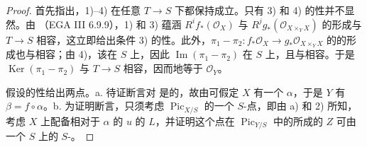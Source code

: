 \begin{proof}
首先指出，1)--4) 在任意 $T\to S$ 下都保持成立。只有 3) 和 4) 的性并不显然。由 （EGA III 6.9.9），1) 和 3) 蕴涵 $R^if_*(\mathcal O_X)$ 与 $R^jg_*(\mathcal O_{X\times_YX})$ 的形成与 $T\to S$ 相容，这立即给出条件 3) 的性。此外，$\pi_1-\pi_2:f_*\mathcal O_X\to g_*\mathcal O_{X\times_YX}$ 的的形成也与相容；由 4)，该在 $S$ 上，因此 $\operatorname{Im}(\pi_1-\pi_2)$ 在 $S$ 上，且与相容。于是 $\operatorname{Ker}(\pi_1-\pi_2)$ 与 $T\to S$ 相容，因而地等于 $\mathcal O_Y$。

假设的性给出两点。a. 待证断言对 是的，故由可假定 $X$ 有一个 $\alpha$，于是 $Y$ 有 $\beta=f\circ\alpha$。b. 为证明断言，只须考虑 $\operatorname{Pic}_{X/S}$ 的一个 $S$-点，即由 a) 和 2) 所知，考虑 $X$ 上配备相对于 $\alpha$ 的 $u$ 的 $L$，并证明这个点在 $\operatorname{Pic}_{Y/S}$ 中的所成的   $Z$ 可由一个 $S$ 上的 $S$-。
\end{proof}

